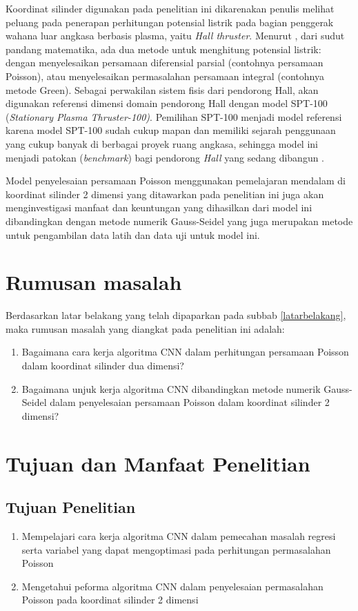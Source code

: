 Koordinat silinder digunakan pada penelitian ini dikarenakan penulis melihat peluang
pada penerapan perhitungan potensial listrik pada bagian penggerak wahana luar angkasa
berbasis plasma, yaitu \emph{Hall thruster}. Menurut \cite{cohl_1999}, dari sudut
pandang matematika, ada dua metode untuk menghitung potensial listrik: dengan menyelesaikan
persamaan diferensial parsial (contohnya persamaan Poisson), atau menyelesaikan
permasalahan persamaan integral (contohnya metode Green). Sebagai perwakilan sistem
fisis dari pendorong Hall, akan digunakan referensi dimensi domain pendorong
Hall dengan model SPT-100 (\emph{Stationary Plasma Thruster-100)}. Pemilihan SPT-100
menjadi model referensi karena model SPT-100 sudah cukup mapan dan memiliki sejarah
penggunaan yang cukup banyak di berbagai proyek ruang angkasa, sehingga model
ini menjadi patokan (\emph{benchmark}) bagi pendorong \emph{Hall} yang sedang
dibangun \citep{braga_miranda_2019}.

Model penyelesaian persamaan Poisson menggunakan pemelajaran mendalam di koordinat
silinder 2 dimensi yang ditawarkan pada penelitian ini juga akan menginvestigasi
manfaat dan keuntungan yang dihasilkan dari model ini dibandingkan dengan metode
numerik Gauss-Seidel yang juga merupakan metode untuk pengambilan data latih dan
data uji untuk model ini.

\section{Rumusan masalah}
Berdasarkan latar belakang yang telah dipaparkan pada subbab \ref{latarbelakang},
maka rumusan masalah yang diangkat pada penelitian ini adalah:
\begin{enumerate}
  \item Bagaimana cara kerja algoritma CNN dalam perhitungan persamaan Poisson dalam
    koordinat silinder dua dimensi?

  \item Bagaimana unjuk kerja algoritma CNN dibandingkan metode numerik Gauss-Seidel
    dalam penyelesaian persamaan Poisson dalam koordinat silinder 2 dimensi?
\end{enumerate}

\section{Tujuan dan Manfaat Penelitian}
\subsection{Tujuan Penelitian}
\begin{enumerate}
  \item Mempelajari cara kerja algoritma CNN dalam pemecahan masalah regresi serta
    variabel yang dapat mengoptimasi pada perhitungan permasalahan Poisson

  \item Mengetahui peforma algoritma CNN dalam penyelesaian permasalahan Poisson
    pada koordinat silinder 2 dimensi
\end{enumerate}

